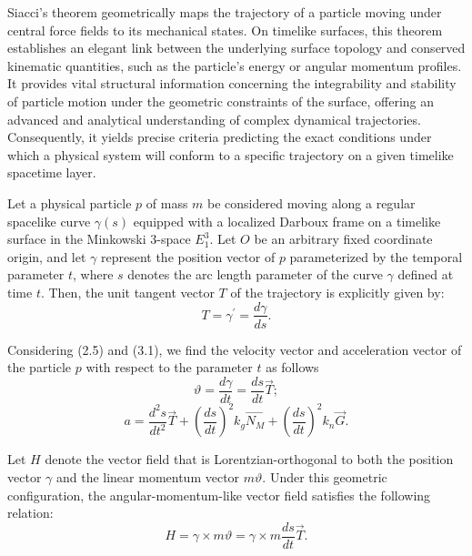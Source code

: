 \documentclass[reqno]{amsart}
\theoremstyle{plain}
\numberwithin{equation}{section}
\begin{document}
Siacci's theorem geometrically maps the trajectory of a particle moving under central force fields to its mechanical states. On timelike surfaces, this theorem establishes an elegant link between the underlying surface topology and conserved kinematic quantities, such as the particle's energy or angular momentum profiles. It provides vital structural information concerning the integrability and stability of particle motion under the geometric constraints of the surface, offering an advanced and analytical understanding of complex dynamical trajectories. Consequently, it yields precise criteria predicting the exact conditions under which a physical system will conform to a specific trajectory on a given timelike spacetime layer.

Let a physical particle $p$ of mass $m$ be considered moving along a regular spacelike curve $\gamma(s)$ equipped with a localized Darboux frame on a timelike surface in the Minkowski 3-space $E_1^3$. Let $O$ be an arbitrary fixed coordinate origin, and let $\gamma$ represent the position vector of $p$ parameterized by the temporal parameter $t$, where $s$ denotes the arc length parameter of the curve $\gamma$ defined at time $t$. Then, the unit tangent vector $T$ of the trajectory is explicitly given by:
\begin{equation}
T=\gamma ^{\prime }=\frac{d\gamma }{ds}.  \tag{3.1}
\end{equation}

Considering (2.5) and (3.1), we find the velocity vector and acceleration
vector of the particle $p$ with respect to the parameter $t$ as follows%
\begin{equation}
\vartheta =\frac{d\gamma}{dt}=\frac{ds}{dt}\overrightarrow{T};  \tag{3.2}
\end{equation}%
\begin{equation}
a=\frac{d^{2}s}{dt^{2}}\overrightarrow{T}+\left( \frac{ds}{dt}\right)
^{2}k_{g}\overrightarrow{N_{M}}+\left( \frac{ds}{dt}\right) ^{2}k_{n}%
\overrightarrow{G}.  \tag{3.3}
\end{equation}

Let $H$ denote the vector field that is Lorentzian-orthogonal to both the position vector $\gamma$ and the linear momentum vector $m\vartheta$. Under this geometric configuration, the angular-momentum-like vector field satisfies the following relation:
\begin{equation}
H=\gamma \times m\vartheta =\gamma \times m\frac{ds}{dt}\overrightarrow{T}. 
\tag{3.4}
\end{equation}
\end{document}
